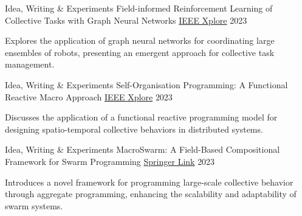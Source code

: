 
\begin{cventries}

  \cventry
    {Idea, Writing \& Experiments} %
    {Field-informed Reinforcement Learning of Collective Tasks with Graph Neural Networks} %
    {\href{https://doi.org/10.1109/ACSOS58161.2023.00021}{IEEE Xplore}} %
    {2023} %
    {
      \begin{cvitems} %
        \item {Explores the application of graph neural networks for coordinating large ensembles of robots, presenting an emergent approach for collective task management.}
      \end{cvitems}
    }

  \cventry
    {Idea, Writing \& Experiments}
    {Self-Organisation Programming: A Functional Reactive Macro Approach} %
    {\href{https://doi.org/10.1109/ACSOS58161.2023.00026}{IEEE Xplore}} %
    {2023} %
    {
      \begin{cvitems} %
        \item {Discusses the application of a functional reactive programming model for designing spatio-temporal collective behaviors in distributed systems.}
      \end{cvitems}
    }

  \cventry
    {Idea, Writing \& Experiments}
    {MacroSwarm: A Field-Based Compositional Framework for Swarm Programming} %
    {\href{https://doi.org/10.1007/978-3-031-35361-1_2}{Springer Link}} %
    {2023} %
    {
      \begin{cvitems} %
        \item {Introduces a novel framework for programming large-scale collective behavior through aggregate programming, enhancing the scalability and adaptability of swarm systems.}
      \end{cvitems}
    }


\end{cventries}
